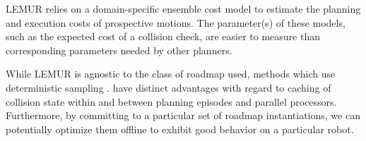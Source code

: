 LEMUR relies on a domain-specific ensemble cost model to
estimate the planning and execution costs of prospective motions.
The parameter(s) of these models,
such as the expected cost of a collision check,
are easier to measure than corresponding parameters needed by
other planners.


While LEMUR is agnostic to the class of roadmap used,
methods which use deterministic sampling
\citep{lavalle2004deterministic, janson2015deterministicsampling}.
have distinct advantages with regard to caching of collision state
within and between planning episodes and parallel processors.
Furthermore,
by committing to a particular set of roadmap instantiations,
we can potentially optimize them offline \citep{salzman2014sparsification}
to exhibit good behavior on a particular robot.



